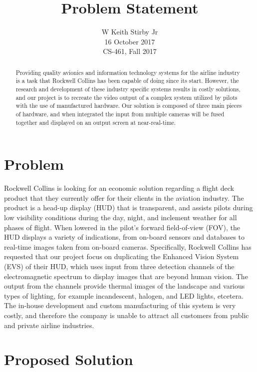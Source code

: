 \documentclass[letterpaper,10pt,serif,draftclsnofoot,onecolumn,compsoc,titlepage]{IEEEtran}
\title{Problem Statement}
\author{W Keith Stirby Jr \\ 16 October 2017 \\ CS-461, Fall 2017}
\begin{document}
\maketitle
\begin{abstract}

Providing quality avionics and information technology systems for the airline industry 
is a task that Rockwell Collins has been capable of doing since its start. However, 
the research and development of these industry specific systems results in costly 
solutions, and our project is to recreate the video output of a complex system utilized
 by pilots with the use of manufactured hardware. Our solution is composed of three 
main pieces of hardware, and when integrated the input from multiple cameras will be 
fused together and displayed on an output screen at near-real-time. \\

\end{abstract}

\section{Problem}

Rockwell Collins is looking for an economic solution regarding a flight deck product 
that they currently offer for their clients in the aviation industry. The product is 
a head-up display (HUD) that is transparent, and assists pilots during low visibility 
conditions during the day, night, and inclement weather for all phases of flight. 
When lowered in the pilot’s forward field-of-view (FOV), the HUD displays a variety 
of indications, from on-board sensors and databases to real-time images taken from 
on-board cameras. Specifically, Rockwell Collins has requested that our project focus
 on duplicating the Enhanced Vision System (EVS) of their HUD, which uses input from 
 three detection channels of the electromagnetic spectrum to display images that are 
 beyond human vision. The output from the channels provide thermal images of the 
 landscape and various types of lighting, for example incandescent, halogen, and LED 
 lights, etcetera. The in-house development and custom manufacturing of this system 
 is very costly, and therefore the company is unable to attract all customers from 
public and private airline industries.\\
 
\section{Proposed Solution}
\end{document}
